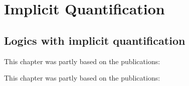\documentclass[11pt,a4paper,twoside]{book}
\newcommand\blankpage{%
    \null
    \thispagestyle{empty}%
    \addtocounter{page}{-1}%
    \newpage}
\begin{document}
    
    

    \printglossary[title=List of Abbreviations and Glossary] %

	


\mainmatter


 
\label{intro}





\chapter{Implicit Quantification}\label{problem}\label{semantics}

% 
 

\section{Logics with implicit quantification}



\newpage
This chapter was partly based on the publications:
\vspace{0.3cm}


\vspace{0.3cm}



\label{ela}



\newpage
This chapter was partly based on the publications:
\vspace{0.5cm}
\end{document}

